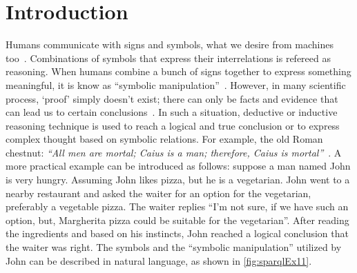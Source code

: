 \section{Introduction}
Humans communicate with signs and symbols, what we desire from machines too~\cite{SAI}. Combinations of symbols that express their interrelations is refereed as reasoning. When humans combine a bunch of signs together to express something meaningful, it is know as ``symbolic manipulation''~\cite{alirezaie2019semantic}. However, in many scientific process, `proof' simply doesn't exist; there can only be facts and evidence that can lead us to certain conclusions~\cite{SAI,tolstoy2005death}. In such a situation, deductive or inductive reasoning technique is used to reach a logical and true conclusion or to express complex thought based on symbolic relations. For example, the old Roman chestnut: \textit{``All men are mortal; Caius is a man; therefore, Caius is mortal''}~\cite{tolstoy2005death}. 
A more practical example can be introduced as follows: suppose a man named John is very hungry. Assuming John likes pizza, but he is a vegetarian. John went to a nearby restaurant and asked the waiter for an option for the vegetarian, preferably a vegetable pizza. The waiter replies ``I'm not sure, if we have such an option, but, Margherita pizza could be suitable for the vegetarian''. 
After reading the ingredients and based on his instincts, John reached a logical conclusion that the waiter was right. The symbols and the ``symbolic manipulation'' utilized by John can be described in natural language, as shown in \cref{fig:sparqlEx11}.   

